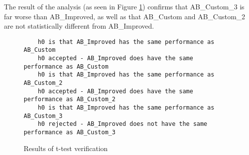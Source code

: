 \documentclass[12pt, a4paper]{article}
\begin{document}
The result of the analysis (as seen in Figure \ref{fig-code-ttest-results}) confirms
that AB\_Custom\_3 is far worse than AB\_Improved, as well as that AB\_Custom and
AB\_Custom\_2 are not statistically different from AB\_Improved.

\begin{figure}

  \begin{verbatim}
    h0 is that AB_Improved has the same performance as AB_Custom
    h0 accepted - AB_Improved does have the same performance as AB_Custom
    h0 is that AB_Improved has the same performance as AB_Custom_2
    h0 accepted - AB_Improved does have the same performance as AB_Custom_2
    h0 is that AB_Improved has the same performance as AB_Custom_3
    h0 rejected - AB_Improved does not have the same performance as AB_Custom_3
  \end{verbatim}
\caption{Results of t-test verification}
\label{fig-code-ttest-results}
\end{figure}
\end{document}
